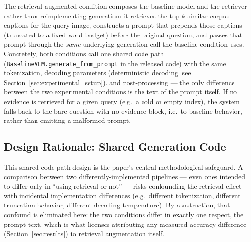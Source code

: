 The retrieval-augmented condition composes the baseline model and the
retriever rather than reimplementing generation: it retrieves the top-$k$
similar corpus captions for the query image, constructs a prompt that
prepends those captions (truncated to a fixed word budget) before the
original question, and passes that prompt through the \emph{same}
underlying generation call the baseline condition uses. Concretely, both
conditions call one shared code path
(\texttt{BaselineVLM.generate\_from\_prompt} in the released code) with the
same tokenization, decoding parameters (deterministic decoding; see
Section~\ref{sec:experimental_setup}), and post-processing --- the only
difference between the two experimental conditions is the text of the
prompt itself. If no evidence is retrieved for a given query (e.g.\ a
cold or empty index), the system falls back to the bare question with no
evidence block, i.e.\ to baseline behavior, rather than emitting a
malformed prompt.

\subsection{Design Rationale: Shared Generation Code}

This shared-code-path design is the paper's central methodological
safeguard. A comparison between two differently-implemented pipelines ---
even ones intended to differ only in ``using retrieval or not'' --- risks
confounding the retrieval effect with incidental implementation
differences (e.g.\ different tokenization, different truncation behavior,
different decoding temperature). By construction, that confound is
eliminated here: the two conditions differ in exactly one respect, the
prompt text, which is what licenses attributing any measured accuracy
difference (Section~\ref{sec:results}) to retrieval augmentation itself.
